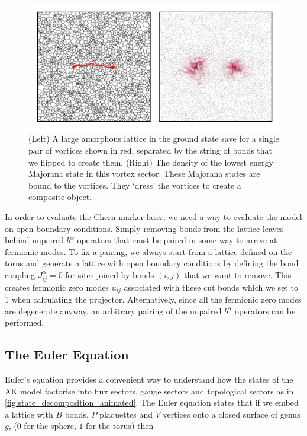 \hypertarget{fig:majorana_bound_states}{%
\begin{figure}
\centering
\includegraphics[width=1\textwidth,height=\textheight]{figure_code/amk_chapter/majorana_bound_states/majorana_bound_states}
\caption[{Majorana Bound States}]{(Left) A large amorphous lattice in the ground state save for a single pair of vortices shown in red, separated by the string of bonds that we flipped to create them. (Right) The density of the lowest energy Majorana state in this vortex sector. These Majorana states are bound to the vortices. They `dress' the vortices to create a composite object.}
\label{fig:majorana_bound_states}
\end{figure}
}

In order to evaluate the Chern marker later, we need a way to evaluate the model on open boundary conditions. Simply removing bonds from the lattice leaves behind unpaired \(b^\alpha\) operators that must be paired in some way to arrive at fermionic modes. To fix a pairing, we always start from a lattice defined on the torus and generate a lattice with open boundary conditions by defining the bond coupling \(J^{\alpha}_{ij} = 0\) for sites joined by bonds \((i,j)\) that we want to remove. This creates fermionic zero modes \(u_{ij}\) associated with these cut bonds which we set to 1 when calculating the projector. Alternatively, since all the fermionic zero modes are degenerate anyway, an arbitrary pairing of the unpaired \(b^\alpha\) operators can be performed.

\hypertarget{the-euler-equation}{%
\subsection{The Euler Equation}\label{the-euler-equation}}

Euler's equation provides a convenient way to understand how the states of the AK model factorise into flux sectors, gauge sectors and topological sectors as in \cref{fig:state_decomposition_animated}. The Euler equation states that if we embed a lattice with \(B\) bonds, \(P\) plaquettes and \(V\) vertices onto a closed surface of genus \(g\), (\(0\) for the sphere, \(1\) for the torus) then


